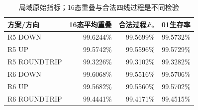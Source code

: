 \begin{table}[htbp]\centering\small
\caption{局域原始指标；16态重叠与合法四线过程是不同检验}\label{tab:localresults}
\begin{tabular}{@{}lrrr@{}}\toprule
方案/方向 & 16态平均重叠 & 合法过程$F_{\mathrm e}$ & 01生存率\\\midrule
R5 DOWN & 99.6244\% & 99.5699\% & 99.5732\%\\
R5 UP & 99.5742\% & 99.5596\% & 99.5729\%\\
R5 ROUNDTRIP & 99.3226\% & 99.3102\% & 99.3282\%\\
R6 DOWN & 99.6068\% & 99.5516\% & 99.5706\%\\
R6 UP & 99.5682\% & 99.5560\% & 99.5702\%\\
R6 ROUNDTRIP & 99.4441\% & 99.4171\% & 99.4515\%\\
\bottomrule\end{tabular}\end{table}
